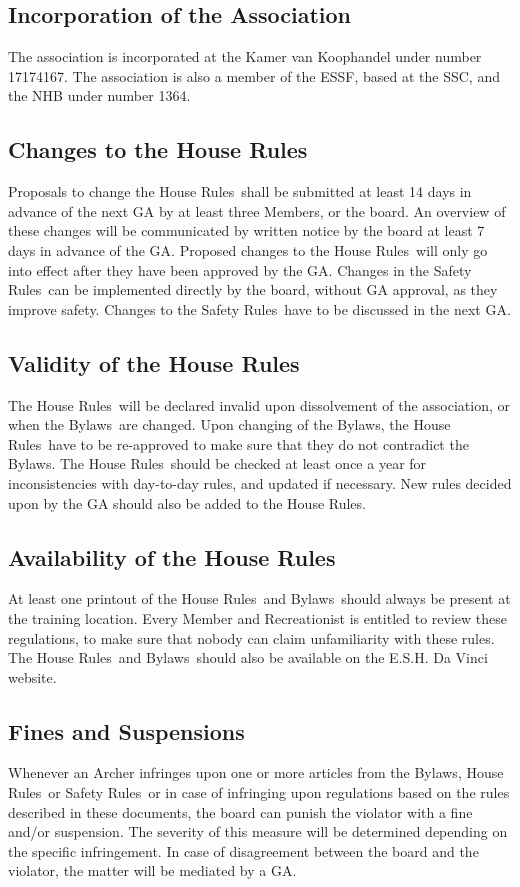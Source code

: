 \documentclass[a4paper]{article}
\newcommand{\Asta}{Bylaws} %
\newcommand{\Ahr}{House Rules} %
\newcommand{\Asr}{Safety Rules} %
\begin{document}
\subsection{Incorporation of the Association}
The association is incorporated at the Kamer van Koophandel under number 17174167. The association is also a member of the ESSF, based at the SSC, and the NHB under number 1364.

\subsection{Changes to the \Ahr}
Proposals to change the \Ahr\ shall be submitted at least 14 days in advance of the next GA by at least three Members, or the board. An overview of these changes will be communicated by written notice by the board at least 7 days in advance of the GA. Proposed changes to the \Ahr\ will only go into effect after they have been approved by the GA. Changes in the \Asr\ can be implemented directly by the board, without GA approval, as they improve safety. Changes to the \Asr\ have to be discussed in the next GA.

\subsection{Validity of the \Ahr}
The \Ahr\ will be declared invalid upon dissolvement of the association, or when the \Asta\ are changed. Upon changing of the \Asta , the \Ahr\ have to be re-approved to make sure that they do not contradict the \Asta . The \Ahr\ should be checked at least once a year for inconsistencies with day-to-day rules, and updated if necessary. New rules decided upon by the GA should also be added to the \Ahr .

\subsection{Availability of the \Ahr}
At least one printout of the \Ahr\ and \Asta\ should always be present at the training location. Every Member and Recreationist is entitled to review these regulations, to make sure that nobody can claim unfamiliarity with these rules. The \Ahr\ and \Asta\ should also be available on the E.S.H. Da Vinci website.

\subsection{Fines and Suspensions}
\label{rules:ban}
Whenever an Archer infringes upon one or more articles from the \Asta , \Ahr\ or \Asr\, or in case of infringing upon regulations based on the rules described in these documents, the board can punish the violator with a fine and/or suspension. The severity of this measure will be determined depending on the specific infringement. In case of disagreement between the board and the violator, the matter will be mediated by a GA.
\end{document}
